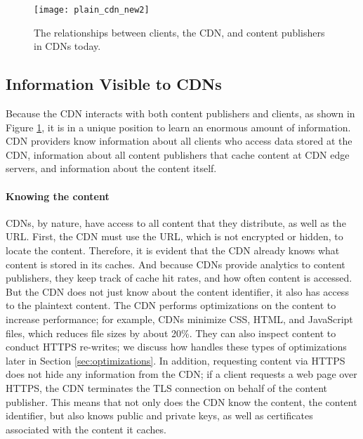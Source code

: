 \begin{figure}[t]
\centering
\texttt{[image: plain\_cdn\_new2]}
\caption{The relationships between clients, the CDN, and content publishers in 
CDNs today.}
\label{fig:basic_cdn}
\end{figure}

\subsection{Information Visible to CDNs}
\label{sec:info}
Because the CDN interacts with both content publishers and clients, as shown in Figure \ref{fig:basic_cdn}, it is in a unique position 
to learn an enormous amount of information.  CDN providers know information about all clients who
access data stored at the CDN, information about all content publishers that cache content at 
CDN edge servers, and information about the content itself.

\paragraph{Knowing the content}  CDNs, by nature, have access to all content that they distribute, as well as 
the URL.  First, the CDN must use the URL, which is not 
encrypted or hidden, to locate the content. Therefore, it is evident that the CDN already knows what content is 
stored in its caches.  And because CDNs provide analytics to content publishers, they keep track of cache hit 
rates, and how often content is accessed.  But the CDN does not just know about the content identifier, it also 
has access to the plaintext content.  The CDN performs optimizations on the content to increase performance; 
for example, CDNs minimize CSS, HTML, and JavaScript files, which reduces file sizes by about 20\%.  They can 
also inspect content to conduct HTTPS re-writes; we discuss how \system{} handles these types of optimizations later 
in Section \ref{sec:optimizations}. In addition, requesting content via HTTPS does not hide any information 
from the CDN; if a client requests a web page over HTTPS, the CDN terminates the TLS connection on behalf of the 
content publisher.  This means that not only does the CDN know the content, the content identifier, but also knows 
public and private keys, as well as certificates associated with the content it caches.  

